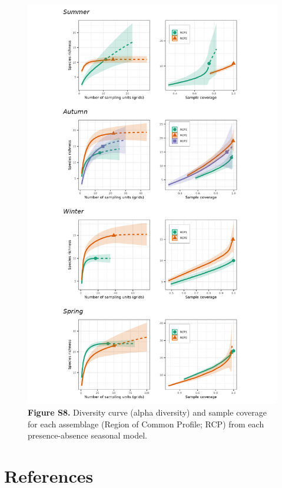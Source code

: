 \documentclass[
]{article}
\begin{document}
\begin{figure}
\centering
\includegraphics{../results/FigS8_iNEXT.png}
\caption{\textbf{Figure S8.} Diversity curve (alpha diversity) and
sample coverage for each assemblage (Region of Common Profile; RCP) from
each presence-absence seasonal model.}
\end{figure}

\newpage

\hypertarget{references}{%
\section*{References}\label{references}}
\end{document}
